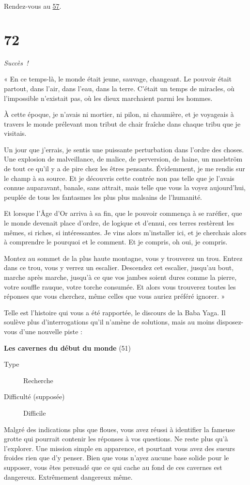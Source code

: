 \documentclass{report}
\newcommand{\gsection}[1]{
    \section{#1}
    \label{section-#1}
}
\newcommand{\glink}[1]{\hyperref[section-#1]{#1}}
\newcommand{\quest}[5]{
    \begin{mdframed}[innertopmargin=0.5cm,innerbottommargin=0.5cm,leftmargin=0.5cm,rightmargin=0.5cm]
        \begin{center}
            \textbf{#1} (#2)
        \end{center}
        \begin{description}
            \item[Type] #3
            \item[Difficulté (supposée)] #4
        \end{description}
        #5
    \end{mdframed}
}
\newcommand{\success}{\emph{Succès !}}
\begin{document}
Rendez-vous au \glink{57}.

\gsection{72}

\success

« En ce temps-là, le monde était jeune, sauvage, changeant. Le pouvoir était partout, dans l'air, dans l'eau, dans la terre. C'était un temps de miracles, où l'impossible n'existait pas, où les dieux marchaient parmi les hommes.

À cette époque, je n'avais ni mortier, ni pilon, ni chaumière, et je voyageais à travers le monde prélevant mon tribut de chair fraîche dans chaque tribu que je visitais.

Un jour que j'errais, je sentis une puissante perturbation dans l'ordre des choses. Une explosion de malveillance, de malice, de perversion, de haine, un maelström de tout ce qu'il y a de pire chez les êtres pensants. Évidemment, je me rendis sur le champ à sa source. Et je découvris cette contrée non pas telle que je l'avais connue auparavant, banale, sans attrait, mais telle que vous la voyez aujourd'hui, peuplée de tous les fantasmes les plus plus malsains de l'humanité.

Et lorsque l'Âge d'Or arriva à sa fin, que le pouvoir commença à se raréfier, que le monde devenait place d'ordre, de logique et d'ennui, ces terres restèrent les mêmes, si riches, si intéressantes. Je vins alors m'installer ici, et je cherchais alors à comprendre le pourquoi et le comment. Et je compris, oh oui, je compris.

Montez au sommet de la plus haute montagne, vous y trouverez un trou. Entrez dans ce trou, vous y verrez un escalier. Descendez cet escalier, jusqu'au bout, marche après marche, jusqu'à ce que vos jambes soient dures comme la pierre, votre souffle rauque, votre torche consumée. Et alors vous trouverez toutes les réponses que vous cherchez, même celles que vous auriez préféré ignorer. »

Telle est l'histoire qui vous a été rapportée, le discours de la Baba Yaga. Il soulève plus d'interrogations qu'il n'amène de solutions, mais au moins disposez-vous d'une nouvelle piste :

\quest{Les cavernes du début du monde}{51}{Recherche}{Difficile}{
Malgré des indications plus que floues, vous avez réussi à identifier la fameuse grotte qui pourrait contenir les réponses à vos questions. Ne reste plus qu'à l'explorer. Une mission simple en apparence, et pourtant vous avez des sueurs froides rien que d'y penser. Bien que vous n'ayez aucune base solide pour le supposer, vous êtes persuadé que ce qui cache au fond de ces cavernes est dangereux. Extrêmement dangereux même.
}
\end{document}
